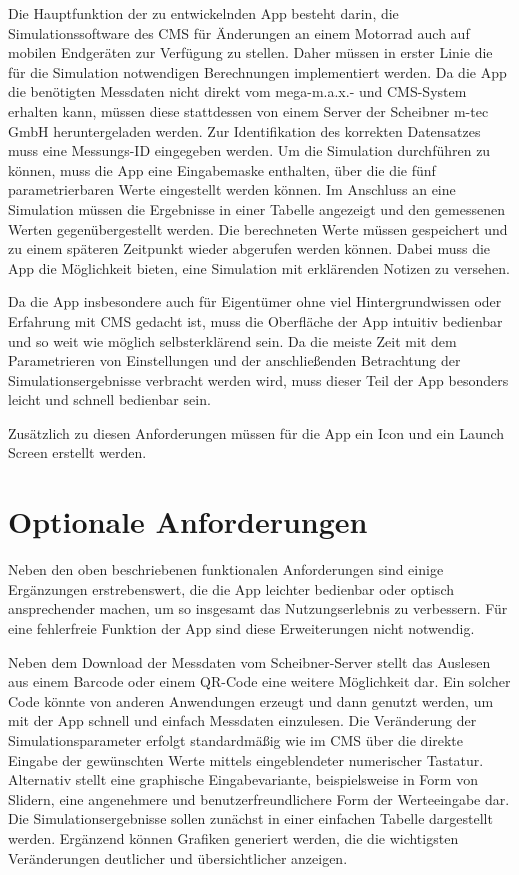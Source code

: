 	Die Hauptfunktion der zu entwickelnden App besteht darin, die Simulationssoftware des CMS für Änderungen an einem Motorrad auch auf mobilen Endgeräten zur Verfügung zu stellen. Daher müssen in erster Linie die für die Simulation notwendigen Berechnungen implementiert werden. Da die App die benötigten Messdaten nicht direkt vom mega-m.a.x.- und CMS-System erhalten kann, müssen diese stattdessen von einem Server der Scheibner m-tec GmbH heruntergeladen werden. Zur Identifikation des korrekten Datensatzes muss eine Messungs-ID eingegeben werden. Um die Simulation durchführen zu können, muss die App eine Eingabemaske enthalten, über die die fünf parametrierbaren Werte eingestellt werden können. Im Anschluss an eine Simulation müssen die Ergebnisse in einer Tabelle angezeigt und den gemessenen Werten gegenübergestellt werden. Die berechneten Werte müssen gespeichert und zu einem späteren Zeitpunkt wieder abgerufen werden können. Dabei muss die App die Möglichkeit bieten, eine Simulation mit erklärenden Notizen zu versehen.
	
	Da die App insbesondere auch für Eigentümer ohne viel Hintergrundwissen oder Erfahrung mit CMS gedacht ist, muss die Oberfläche der App intuitiv bedienbar und so weit wie möglich selbsterklärend sein. Da die meiste Zeit mit dem Parametrieren von Einstellungen und der anschließenden Betrachtung der Simulationsergebnisse verbracht werden wird, muss dieser Teil der App besonders leicht und schnell bedienbar sein.
	
	Zusätzlich zu diesen Anforderungen müssen für die App ein Icon und ein Launch Screen erstellt werden.
	
	\section{Optionale Anforderungen}
	\label{sec:optionale-anf}
	
	Neben den oben beschriebenen funktionalen Anforderungen sind einige Ergänzungen erstrebenswert, die die App leichter bedienbar oder optisch ansprechender machen, um so insgesamt das Nutzungserlebnis zu verbessern. Für eine fehlerfreie Funktion der App sind diese Erweiterungen nicht notwendig.
	
	Neben dem Download der Messdaten vom Scheibner-Server stellt das Auslesen aus einem Barcode oder einem QR-Code eine weitere Möglichkeit dar. Ein solcher Code könnte von anderen Anwendungen erzeugt und dann genutzt werden, um mit der App schnell und einfach Messdaten einzulesen.
	Die Veränderung der Simulationsparameter erfolgt standardmäßig wie im CMS über die direkte Eingabe der gewünschten Werte mittels eingeblendeter numerischer Tastatur. Alternativ stellt eine graphische Eingabevariante, beispielsweise in Form von Slidern, eine angenehmere und benutzerfreundlichere Form der Werteeingabe dar.
	Die Simulationsergebnisse sollen zunächst in einer einfachen Tabelle dargestellt werden. Ergänzend können Grafiken generiert werden, die die wichtigsten Veränderungen deutlicher und übersichtlicher anzeigen.

